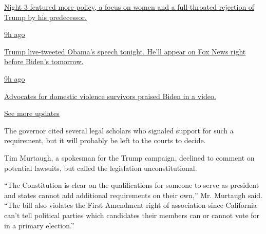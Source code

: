 \href{https://www.nytimes3xbfgragh.onion/live/2020/08/19/us/dnc-convention-election?action=click\&pgtype=Article\&state=default\&region=MAIN_CONTENT_1\&context=storylines_live_updates\#night-3-featured-more-policy-a-focus-on-women-and-a-full-throated-rejection-of-trump-by-his-predecessor}{Night
3 featured more policy, a focus on women and a full-throated rejection
of Trump by his predecessor.}

\href{https://www.nytimes3xbfgragh.onion/live/2020/08/19/us/dnc-convention-election?action=click\&pgtype=Article\&state=default\&region=MAIN_CONTENT_1\&context=storylines_live_updates\#trump-live-tweeted-obamas-speech-tonight-hell-appear-on-fox-news-right-before-bidens-tomorrow}{9h
ago}

\href{https://www.nytimes3xbfgragh.onion/live/2020/08/19/us/dnc-convention-election?action=click\&pgtype=Article\&state=default\&region=MAIN_CONTENT_1\&context=storylines_live_updates\#trump-live-tweeted-obamas-speech-tonight-hell-appear-on-fox-news-right-before-bidens-tomorrow}{Trump
live-tweeted Obama's speech tonight. He'll appear on Fox News right
before Biden's tomorrow.}

\href{https://www.nytimes3xbfgragh.onion/live/2020/08/19/us/dnc-convention-election?action=click\&pgtype=Article\&state=default\&region=MAIN_CONTENT_1\&context=storylines_live_updates\#advocates-for-domestic-violence-survivors-praised-biden-in-a-video}{9h
ago}

\href{https://www.nytimes3xbfgragh.onion/live/2020/08/19/us/dnc-convention-election?action=click\&pgtype=Article\&state=default\&region=MAIN_CONTENT_1\&context=storylines_live_updates\#advocates-for-domestic-violence-survivors-praised-biden-in-a-video}{Advocates
for domestic violence survivors praised Biden in a video.}

\href{https://www.nytimes3xbfgragh.onion/live/2020/08/19/us/dnc-convention-election?action=click\&pgtype=Article\&state=default\&region=MAIN_CONTENT_1\&context=storylines_live_updates}{See
more updates}

The governor cited several legal scholars who signaled support for such
a requirement, but it will probably be left to the courts to decide.

Tim Murtaugh, a spokesman for the Trump campaign, declined to comment on
potential lawsuits, but called the legislation unconstitutional.

``The Constitution is clear on the qualifications for someone to serve
as president and states cannot add additional requirements on their
own,'' Mr. Murtaugh said. ``The bill also violates the First Amendment
right of association since California can't tell political parties which
candidates their members can or cannot vote for in a primary election.''

